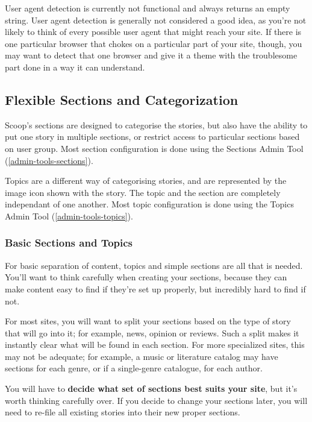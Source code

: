User agent detection is currently not functional and always returns an empty string. User agent detection is generally not considered a good idea, as you're not likely to think of every possible user agent that might reach your site. If there is one particular browser that chokes on a particular part of your site, though, you may want to detect that one browser and give it a theme with the troublesome part done in a way it can understand.

\subsection{Flexible Sections and Categorization}
\label{features-sections}

Scoop's sections are designed to categorise the stories, but also have the ability to put one story in multiple sections, or restrict access to particular sections based on user group.  Most section configuration is done using the Sections Admin Tool (\ref{admin-tools-sections}).

Topics are a different way of categorising stories, and are represented by the image icon shown with the story.  The topic and the section are completely independant of one another.  Most topic configuration is done using the Topics Admin Tool (\ref{admin-tools-topics}).

\subsubsection{Basic Sections and Topics}
\label{sections-basic}

For basic separation of content, topics and simple sections are all that is needed.  You'll want to think carefully when creating your sections, because they can make content easy to find if they're set up properly, but incredibly hard to find if not.

For most sites, you will want to split your sections based on the type of story that will go into it; for example, news, opinion or reviews.  Such a split makes it instantly clear what will be found in each section.  For more specialized sites, this may not be adequate; for example, a music or literature catalog may have sections for each genre, or if a single-genre catalogue, for each author.

You will have to {\bf decide what set of sections best suits your site}, but it's worth thinking carefully over.  If you decide to change your sections later, you will need to re-file all existing stories into their new proper sections.

